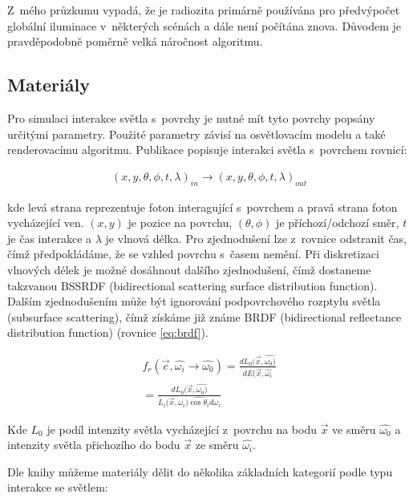 Z~mého průzkumu vypadá, že je radiozita primárně používána pro předvýpočet globální iluminace v~některých scénách a dále není počítána znova. Důvodem je pravděpodobně poměrně velká náročnost algoritmu.

\subsection{Materiály}
Pro simulaci interakce světla s~povrchy je nutné mít tyto povrchy popsány určitými parametry. Použité parametry závisí na osvětlovacím modelu a také renderovacímu algoritmu. Publikace \cite{materials} popisuje interakci světla s~povrchem rovnicí:

\begin{equation} \label{eq:surface_photon}
	\begin{gathered}
		(x, y, \theta, \phi, t, \lambda)_{in} \xrightarrow{} (x, y, \theta, \phi, t, \lambda)_{out}
	\end{gathered}
\end{equation}

kde levá strana reprezentuje foton interagující s~povrchem a pravá strana foton vycházející ven. $(x, y)$ je pozice na povrchu, $(\theta, \phi)$ je příchozí/odchozí směr, $t$ je čas interakce a $\lambda$ je vlnová délka. Pro zjednodušení lze z~rovnice odstranit čas, čímž předpokládáme, že se vzhled povrchu s~časem nemění. Při diskretizaci vlnových délek je možné dosáhnout dalšího zjednodušení, čímž dostaneme takzvanou BSSRDF (bidirectional scattering surface distribution function). Dalším zjednodušením může být ignorování podpovrchového rozptylu světla (subsurface scattering), čímž získáme již známe BRDF (bidirectional reflectance distribution function) (rovnice \ref{eq:brdf}).

\begin{equation} \label{eq:brdf}
	\begin{gathered}
		f_r(\vec{c}, \hat{\omega_i} \xrightarrow{} \hat{\omega_0}) = \frac{dL_0(\vec{x}, \hat{\omega_0)}}{dE(\vec{x}, \hat{\omega_i}} \\
		= \frac{dL_0(\vec{x}, \hat{\omega_0)}}{L_i(\vec{x}, \hat{\omega_i)\cos \theta_i d\omega_i}}
	\end{gathered}
\end{equation}

Kde $L_0$ je podíl intenzity světla vycházející z~povrchu na bodu $\vec{x}$ ve směru $\hat{\omega_0}$ a intenzity světla přichozího do bodu $\vec{x}$ ze směru $\hat{\omega_i}$.

Dle knihy \cite{hunter_harold_1987} můžeme materiály dělit do několika základních kategorií podle typu interakce se světlem:


